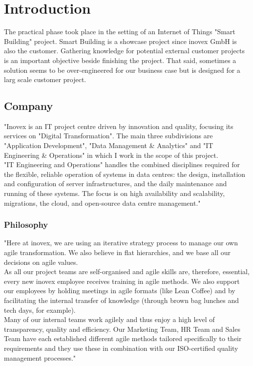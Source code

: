 \section{Introduction}
The practical phase took place in the setting of an Internet of Things "Smart Building" project. Smart Building is a showcase project since inovex GmbH is also the customer. Gathering knowledge for potential external customer projects is an important objective beside finishing the project. That said, sometimes a solution seems to be over-engineered for our business case but is designed for a larg scale customer project.

\subsection{Company}
"Inovex is an IT project centre driven by innovation and quality, focusing its services on "Digital Transformation". The main three subdivisions are "Application Development", "Data Management \& Analytics" and "IT Engineering \& Operations" in which I work in the scope of this project.\\
"IT Engineering and Operations" handles the combined disciplines required for the flexible, reliable operation of systems in data centres: the design, installation and configuration of server infrastructures, and the daily maintenance and running of these systems. The focus is on high availability and scalability, migrations, the cloud, and open-source data centre management."\cite{inovex}

\subsubsection{Philosophy}
"Here at inovex, we are using an iterative strategy process to manage our own agile transformation. We also believe in flat hierarchies, and we base all our decisions on agile values.\\
As all our project teams are self-organised and agile skills are, therefore, essential, every new inovex employee receives training in agile methods. We also support our employees by holding meetings in agile formats (like Lean Coffee) and by facilitating the internal transfer of knowledge (through brown bag lunches and tech days, for example).\\
Many of our internal teams work agilely and thus enjoy a high level of transparency, quality and efficiency. Our Marketing Team, HR Team and Sales Team have each established different agile methods tailored specifically to their requirements and they use these in combination with our ISO-certified quality management processes."\cite{inovex}
\newpage

